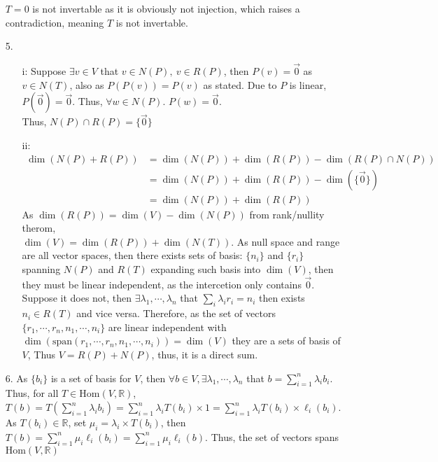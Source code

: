 \documentclass{article}
\begin{document}
\begin{itemize}
    \(T=0\) is not invertable as it is obviously not injection, which raises a contradiction, meaning \(T\) is not invertable.
    \item [5.]
    \begin{itemize}
        \item [i:] Suppose \(\exists v\in V\) that \(v\in N(P),\ v \in R(P)\), then \(P(v) = \overrightarrow{0}\) as \(v\in N(T)\), also as \(P(P(v)) = P(v)\) as stated. Due to \(P\) is linear, \(P(\overrightarrow{0}) = \overrightarrow{0}\). Thus, \(\forall w\in N(P)\). \(P(w)=\overrightarrow{0}\). \\ Thus, \(N(P)\cap R(P) = \{\overrightarrow{0}\}\)
        \item [ii:]\begin{align*}
            \dim (N(P)+R(P)) &= \dim(N(P))+\dim(R(P))-\dim(R(P)\cap N(P))\\
            &=\dim(N(P))+\dim(R(P))-\dim(\{\overrightarrow{0}\})\\
            &=\dim(N(P))+\dim(R(P))
        \end{align*}
        As \(\dim(R(P)) = \dim(V) - \dim(N(P))\) from rank/nullity therom,\\ \(\dim(V) = \dim(R(P))+\dim(N(T))\). As null space and range are all vector spaces, then there exists sets of basis: \(\{n_i\}\) and \(\{r_i\}\) spanning \(N(P)\) and \(R(T)\) expanding such basis into \(\dim(V)\), then they must be linear independent, as the intercetion only contains \(\overrightarrow{0}\). Suppose it does not, then \(\exists \lambda_1,\cdots,\lambda_n\) that \(\sum_i \lambda_i r_i = n_i\) then exists \(n_i\in R(T)\) and vice versa.
        Therefore, as the set of vectors \(\{r_1,\cdots,r_n,n_1,\cdots,n_i\}\) are linear independent with
        \\ \(\dim(\text{span}(r_1,\cdots,r_n,n_1,\cdots,n_i)) = \dim(V)\) they are a sets of basis of \(V\), Thus \(V = R(P)+N(P)\), thus, it is a direct sum.
    \end{itemize}
    \item [6.] As \(\{b_i\}\) is a set of basis for \(V\), then \(\forall b \in V, \exists \lambda_1,\cdots,\lambda_n\) that \(b = \sum_{i=1}^n \lambda_ib_i\). 
    Thus, for all \(T\in \text{Hom}(V,\mathbb{R})\),\\  \(T(b) = T(\sum_{i=1}^n \lambda_ib_i) = \sum_{i=1}^n\lambda_iT(b_i)\times 1 = \sum_{i=1}^n\lambda_iT(b_i)\times \ell_i(b_i) \). As \(T(b_i)\in \mathbb{R}\), set \(\mu_i = \lambda_i\times T(b_i)\), then \(T(b)=\sum_{i=1}^{n}\mu_i \ell_i(b_i)=\sum_{i=1}^{n}\mu_i \ell_i(b)\). Thus, the set of vectors spans \(\text{Hom}(V,\mathbb{R})\)

\end{itemize}
\end{document}
